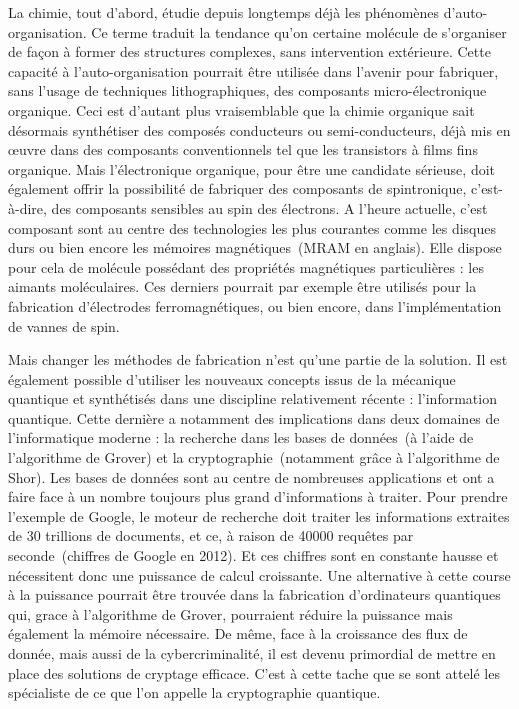 La chimie, tout d'abord, étudie depuis longtemps déjà les phénomènes d'auto-organisation. Ce terme traduit la tendance qu'on certaine molécule de s'organiser de façon à former des structures complexes, sans intervention extérieure. Cette capacité à l'auto-organisation pourrait être utilisée dans l'avenir pour fabriquer, sans l'usage de techniques lithographiques, des composants micro-électronique organique. Ceci est d'autant plus vraisemblable que la chimie organique sait désormais synthétiser des composés conducteurs ou semi-conducteurs, déjà mis en œuvre dans des composants conventionnels tel que les transistors à films fins organique. Mais l'électronique organique, pour être une candidate sérieuse, doit également offrir la possibilité de fabriquer des composants de spintronique, c'est-à-dire, des composants sensibles au spin des électrons. A l'heure actuelle, c'est composant sont au centre des technologies les plus courantes comme les disques durs ou bien encore les mémoires magnétiques~(MRAM en anglais). Elle dispose pour cela de molécule possédant des propriétés magnétiques particulières : les aimants moléculaires. Ces derniers pourrait par exemple \^etre utilisés pour la fabrication d'électrodes ferromagnétiques, ou bien encore, dans l'implémentation de vannes de spin.

Mais changer les méthodes de fabrication n'est qu'une partie de la solution. Il est également possible d'utiliser les nouveaux concepts issus de la mécanique quantique et synthétisés dans une discipline relativement récente : l'information quantique. Cette dernière a notamment des implications dans deux domaines de l'informatique moderne : la recherche dans les bases de données~(à l'aide de l’algorithme de Grover) et la cryptographie~(notamment grâce à l'algorithme de Shor). Les bases de données sont au centre de nombreuses applications et ont a faire face à un nombre toujours plus grand d'informations à traiter. Pour prendre l'exemple de Google, le moteur de recherche doit traiter les informations extraites de 30 trillions de documents, et ce, à raison de 40000 requêtes par seconde~(chiffres de Google en 2012). Et ces chiffres sont en constante hausse et nécessitent donc une puissance de calcul croissante. Une alternative à cette course à la puissance pourrait être trouvée dans la fabrication d'ordinateurs quantiques qui, grace à l'algorithme de Grover, pourraient réduire la puissance mais également la mémoire nécessaire. De m\^eme, face à la croissance des flux de donnée, mais aussi de la cybercriminalité, il est devenu primordial de mettre en place des solutions de cryptage efficace. C'est à cette tache que se sont attelé les spécialiste de ce que l’on appelle la cryptographie quantique.

